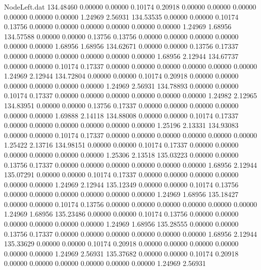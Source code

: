 \begin{filecontents}{NodeLeft.dat}
 134.48460    0.00000    0.00000     0.10174    0.20918    0.00000    0.00000    0.00000    0.00000    0.00000    0.00000    1.24969    2.56931
 134.53535    0.00000    0.00000     0.10174    0.13756    0.00000    0.00000    0.00000    0.00000    0.00000    0.00000    1.24969    1.68956
 134.57588    0.00000    0.00000     0.13756    0.13756    0.00000    0.00000    0.00000    0.00000    0.00000    0.00000    1.68956    1.68956
 134.62671    0.00000    0.00000     0.13756    0.17337    0.00000    0.00000    0.00000    0.00000    0.00000    0.00000    1.68956    2.12944
 134.67737    0.00000    0.00000     0.10174    0.17337    0.00000    0.00000    0.00000    0.00000    0.00000    0.00000    1.24969    2.12944
 134.72804    0.00000    0.00000     0.10174    0.20918    0.00000    0.00000    0.00000    0.00000    0.00000    0.00000    1.24969    2.56931
 134.78893    0.00000    0.00000     0.10174    0.17337    0.00000    0.00000    0.00000    0.00000    0.00000    0.00000    1.24982    2.12965
 134.83951    0.00000    0.00000     0.13756    0.17337    0.00000    0.00000    0.00000    0.00000    0.00000    0.00000    1.69888    2.14118
 134.88008    0.00000    0.00000     0.10174    0.17337    0.00000    0.00000    0.00000    0.00000    0.00000    0.00000    1.25196    2.13331
 134.93083    0.00000    0.00000     0.10174    0.17337    0.00000    0.00000    0.00000    0.00000    0.00000    0.00000    1.25422    2.13716
 134.98151    0.00000    0.00000     0.10174    0.17337    0.00000    0.00000    0.00000    0.00000    0.00000    0.00000    1.25306    2.13518
 135.03223    0.00000    0.00000     0.13756    0.17337    0.00000    0.00000    0.00000    0.00000    0.00000    0.00000    1.68956    2.12944
 135.07291    0.00000    0.00000     0.10174    0.17337    0.00000    0.00000    0.00000    0.00000    0.00000    0.00000    1.24969    2.12944
 135.12349    0.00000    0.00000     0.10174    0.13756    0.00000    0.00000    0.00000    0.00000    0.00000    0.00000    1.24969    1.68956
 135.18427    0.00000    0.00000     0.10174    0.13756    0.00000    0.00000    0.00000    0.00000    0.00000    0.00000    1.24969    1.68956
 135.23486    0.00000    0.00000     0.10174    0.13756    0.00000    0.00000    0.00000    0.00000    0.00000    0.00000    1.24969    1.68956
 135.28555    0.00000    0.00000     0.13756    0.17337    0.00000    0.00000    0.00000    0.00000    0.00000    0.00000    1.68956    2.12944
 135.33629    0.00000    0.00000     0.10174    0.20918    0.00000    0.00000    0.00000    0.00000    0.00000    0.00000    1.24969    2.56931
 135.37682    0.00000    0.00000     0.10174    0.20918    0.00000    0.00000    0.00000    0.00000    0.00000    0.00000    1.24969    2.56931

\end{filecontents}
